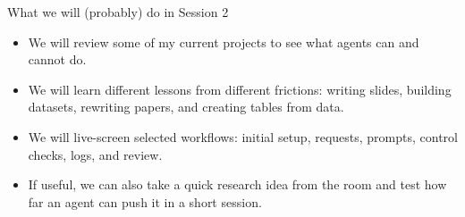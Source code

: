 \begin{frame}{What we will (probably) do in Session 2}
  \vspace{0.2cm}
  \begin{itemize}\setlength\itemsep{0.35em}
    \item We will review some of my current projects to see what agents can and cannot do.
    \item We will learn different lessons from different frictions: writing slides, building datasets, rewriting papers, and creating tables from data.
    \item We will live-screen selected workflows: initial setup, requests, prompts, control checks, logs, and review.
    \item If useful, we can also take a quick research idea from the room and test how far an agent can push it in a short session.
  \end{itemize}
  \vspace{0.45cm}
\end{frame}

